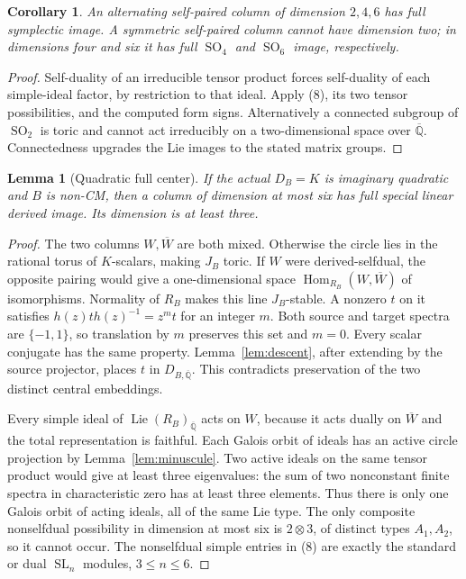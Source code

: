 \documentclass[11pt]{article}
\newcommand{\kk}{{\overline{\mathbb Q}}}
\DeclareMathOperator{\Hom}{Hom}
\DeclareMathOperator{\Lie}{Lie}
\DeclareMathOperator{\SL}{SL}
\DeclareMathOperator{\SO}{SO}
\newtheorem{lemma}[theorem]{Lemma}
\newtheorem{corollary}[theorem]{Corollary}
\theoremstyle{remark}
\begin{document}
\begin{corollary}\label{cor:selfpaired}
An alternating self-paired column of dimension $2,4,6$ has full
symplectic image. A symmetric self-paired column cannot have dimension
two; in dimensions four and six it has full $\SO_4$ and $\SO_6$
image, respectively.
\end{corollary}
\begin{proof}
Self-duality of an irreducible tensor product forces self-duality
of each simple-ideal factor, by restriction to that ideal. Apply
(8), its two tensor possibilities, and the computed form signs.
Alternatively a connected subgroup of $\SO_2$ is toric and cannot
act irreducibly on a two-dimensional space over $\kk$.
Connectedness upgrades the Lie images to the stated matrix groups.
\end{proof}

\begin{lemma}[Quadratic full center]\label{lem:quadratic}
If the actual $D_B=K$ is imaginary quadratic and $B$ is non-CM,
then a column of dimension at most six has full special linear
derived image. Its dimension is at least three.
\end{lemma}
\begin{proof}
The two columns $W,\overline W$ are both mixed. Otherwise the circle
lies in the rational torus of $K$-scalars, making $J_B$ toric.
If $W$ were derived-selfdual, the opposite pairing would give a
one-dimensional space $\Hom_{R_B}(W,\overline W)$ of isomorphisms.
Normality of $R_B$ makes this line $J_B$-stable. A nonzero $t$ on
it satisfies $h(z)t h(z)^{-1}=z^m t$ for an integer $m$.
Both source and target spectra are $\{-1,1\}$, so translation by
$m$ preserves this set and $m=0$. Every scalar conjugate has the
same property. Lemma~\ref{lem:descent}, after extending by the source
projector, places $t$ in $D_{B,\kk}$. This contradicts preservation
of the two distinct central embeddings.

Every simple ideal of $\Lie(R_B)_\kk$ acts on $W$, because it acts
dually on $\overline W$ and the total representation is faithful.
Each Galois orbit of ideals has an active circle projection by
Lemma~\ref{lem:minuscule}. Two active ideals on the same tensor
product would give at least three eigenvalues: the sum of two
nonconstant finite spectra in characteristic zero has at least
three elements. Thus there is only one Galois orbit of acting ideals,
all of the same Lie type. The only composite nonselfdual possibility
in dimension at most six is $2\otimes3$, of distinct types $A_1,A_2$,
so it cannot occur. The nonselfdual simple entries in (8) are exactly
the standard or dual $\SL_n$ modules, $3\leq n\leq6$.
\end{proof}
\end{document}
